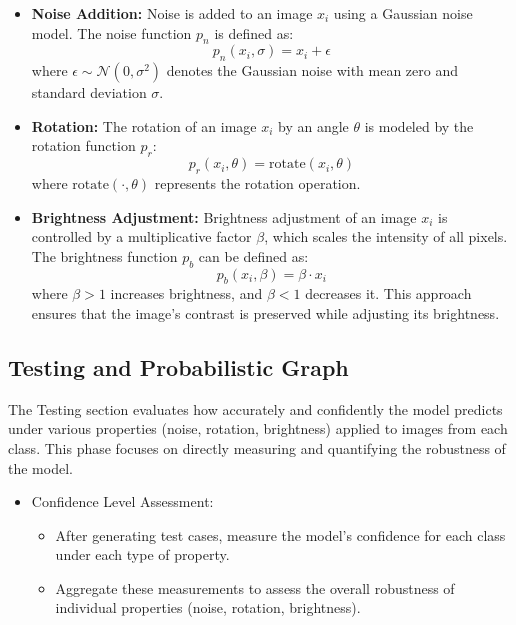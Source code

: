 \documentclass[10pt, conference, a4paper, final]{IEEEtran}
\begin{document}
\begin{itemize}
    \item \textbf{Noise Addition:} Noise is added to an image \( x_i \) using a Gaussian noise model. The noise function \( p_n \) is defined as:
    \[ p_n(x_i, \sigma) = x_i + \epsilon \]
    where \( \epsilon \sim \mathcal{N}(0, \sigma^2) \) denotes the Gaussian noise with mean zero and standard deviation \(\sigma\).

    \item \textbf{Rotation:} The rotation of an image \( x_i \) by an angle \(\theta\) is modeled by the rotation function \( p_r \):
    \[ p_r(x_i, \theta) = \text{rotate}(x_i, \theta) \]
    where \(\text{rotate}(\cdot, \theta)\) represents the rotation operation.

    \item \textbf{Brightness Adjustment:} Brightness adjustment of an image \( x_i \) is controlled by a multiplicative factor \( \beta \), which scales the intensity of all pixels. The brightness function \( p_b \) can be defined as:
    \[ p_b(x_i, \beta) = \beta \cdot x_i \]
    where \( \beta > 1 \) increases brightness, and \( \beta < 1 \) decreases it. This approach ensures that the image's contrast is preserved while adjusting its brightness.

\end{itemize}

\subsection{Testing and Probabilistic Graph}

The Testing section evaluates how accurately and confidently the model predicts under various properties (noise, rotation, brightness) applied to images from each class. This phase focuses on directly measuring and quantifying the robustness of the model.
\begin{itemize}

    \item Confidence Level Assessment:
        \begin{itemize}
            \item After generating test cases, measure the model’s confidence for each class under each type of property.
            \item Aggregate these measurements to assess the overall robustness of individual properties (noise, rotation, brightness).
        \end{itemize}

    \end{itemize}
\end{document}
